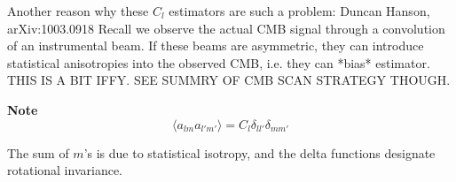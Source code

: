 \documentclass[a4paper, 11pt]{article}
\begin{document}
Another reason why these $C_l$ estimators are such a problem: Duncan Hanson, arXiv:1003.0918
Recall we observe the actual CMB signal through a convolution of an instrumental beam. If these beams are asymmetric, they can introduce statistical anisotropies into the observed CMB, i.e. they can *bias* estimator. THIS IS A BIT IFFY. SEE SUMMRY OF CMB SCAN STRATEGY THOUGH. 

\textbf{Note} %
$$
\langle a_{lm}a_{l'm'} \rangle = C_l \delta_{ll'}\delta_{mm'}
$$

The sum of $m$'s is due to statistical isotropy, and the delta functions designate rotational invariance. 
\end{document}
